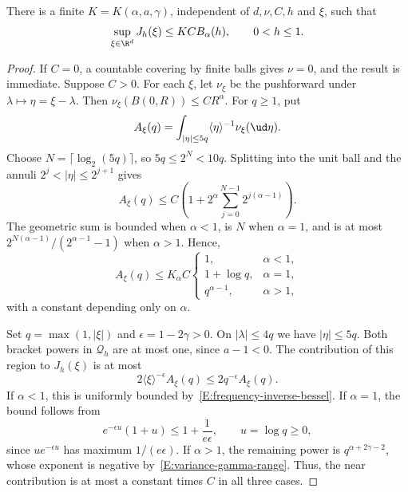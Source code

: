 \begin{proposition}\label{P:frequency-row}
  There is a finite $K = K(\alpha,a,\gamma)$, independent of
  $d,\nu,C,h$ and $\xi$, such that
  \begin{equation}\label{E:frequency-row-bound}
    \sup_{\xi\in\R^d}J_h(\xi) \le K C B_\alpha(h),
    \qquad 0 < h \le 1.
  \end{equation}
\end{proposition}

\begin{proof}
  If $C = 0$, a countable covering by finite balls gives $\nu = 0$, and
  the result is immediate. Suppose $C > 0$. For each $\xi$, let $\nu_\xi$
  be the pushforward under $\lambda \mapsto \eta = \xi-\lambda$.
  Then $\nu_\xi(B(0,R)) \le CR^\alpha$. For $q \ge 1$, put
  \[
    A_\xi(q) = \int_{|\eta|\le5q}\langle\eta\rangle^{-1}
    \nu_\xi(\ud\eta).
  \]
  Choose $N = \lceil\log_2(5q)\rceil$, so $5q \le 2^N < 10q$.
  Splitting into the unit ball and the annuli
  $2^j < |\eta| \le 2^{j+1}$ gives
  \[
    A_\xi(q) \le C\left(1+2^\alpha
    \sum_{j=0}^{N-1}2^{j(\alpha-1)}\right).
  \]
  The geometric sum is bounded when $\alpha < 1$, is $N$ when
  $\alpha = 1$, and is at most
  $2^{N(\alpha-1)}/(2^{\alpha-1}-1)$ when $\alpha > 1$. Hence,
  \begin{equation}\label{E:frequency-inverse-bessel}
    A_\xi(q) \le K_\alpha C
    \begin{cases}
      1, & \alpha < 1,\\
      1+\log q, & \alpha = 1,\\
      q^{\alpha-1}, & \alpha > 1,
    \end{cases}
  \end{equation}
  with a constant depending only on $\alpha$.

  Set $q = \max(1,|\xi|)$ and $\epsilon = 1-2\gamma > 0$. On
  $|\lambda| \le 4q$ we have $|\eta| \le 5q$. Both bracket powers in
  $\mathcal Q_h$ are at most one, since $a-1 < 0$. The contribution of
  this region to $J_h(\xi)$ is at most
  \[
    2\langle\xi\rangle^{-\epsilon}A_\xi(q)
    \le 2q^{-\epsilon}A_\xi(q).
  \]
  If $\alpha < 1$, this is uniformly bounded by~\eqref{E:frequency-inverse-bessel}.
  If $\alpha = 1$, the bound follows from
  \[
    e^{-\epsilon u}(1+u) \le 1+\frac1{e\epsilon},
    \qquad u = \log q \ge 0,
  \]
  since $u e^{-\epsilon u}$ has maximum $1/(e\epsilon)$. If
  $\alpha > 1$, the remaining power is $q^{\alpha+2\gamma-2}$, whose
  exponent is negative by~\eqref{E:variance-gamma-range}. Thus, the near
  contribution is at most a constant times $C$ in all three cases.


\end{proof}
